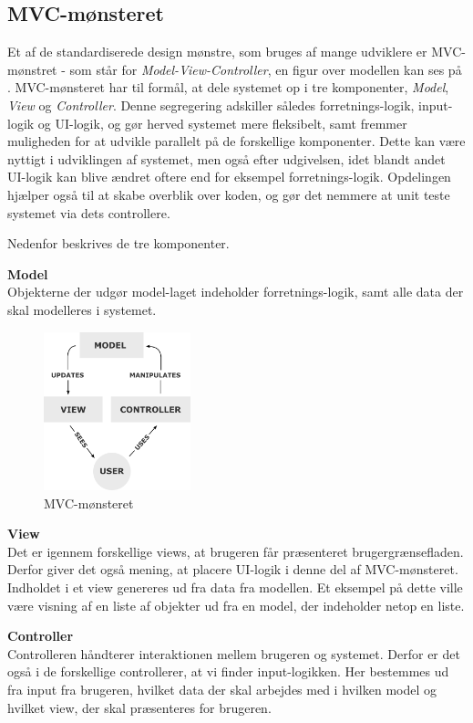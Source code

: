 \subsection{MVC-mønsteret}\label{MVC}

Et af de standardiserede design mønstre, som bruges af mange udviklere er MVC-mønstret - som står for \textit{Model-View-Controller}, en figur over modellen kan ses på .
MVC-mønsteret har til formål, at dele systemet op i tre komponenter, \textit{Model}, \textit{View} og \textit{Controller}.
Denne segregering adskiller således forretnings-logik, input-logik og UI-logik, og gør herved systemet mere fleksibelt, samt fremmer muligheden for at udvikle parallelt på de forskellige komponenter.
Dette kan være nyttigt i udviklingen af systemet, men også efter udgivelsen, idet blandt andet UI-logik kan blive ændret oftere end for eksempel forretnings-logik.
Opdelingen hjælper også til at skabe overblik over koden, og gør det nemmere at unit teste systemet via dets controllere. \citep{MVC_Overview}

Nedenfor beskrives de tre komponenter.

\textbf{Model}\\
Objekterne der udgør model-laget indeholder forretnings-logik, samt alle data der skal modelleres i systemet.

\begin{figure}
	\vspace{0pt}
	\begin{center}
		\includegraphics[width=0.38\textwidth]{images/Images/mvc.png}
	\end{center}
	\vspace{-20pt}
	\label{MVC-Figure}
	\caption{MVC-mønsteret}
	\vspace{-30pt}
\end{figure}

\textbf{View}\\
Det er igennem forskellige views, at brugeren får præsenteret brugergrænsefladen. 
Derfor giver det også mening, at placere UI-logik i denne del af MVC-mønsteret.
Indholdet i et view genereres ud fra data fra modellen.
Et eksempel på dette ville være visning af en liste af objekter ud fra en model, der indeholder netop en liste.

\textbf{Controller}\\
Controlleren håndterer interaktionen mellem brugeren og systemet.
Derfor er det også i de forskellige controllerer, at vi finder input-logikken. 
Her bestemmes ud fra input fra brugeren, hvilket data der skal arbejdes med i hvilken model og hvilket view, der skal præsenteres for brugeren.

